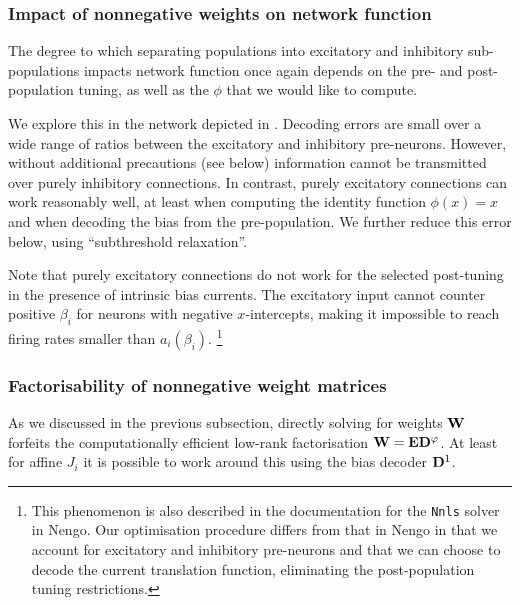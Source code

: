 \subsubsection{Impact of nonnegative weights on network function}
The degree to which separating populations into excitatory and inhibitory sub-populations impacts network function once again depends on the pre- and post-population tuning, as well as the $\phi$ that we would like to compute.

We explore this in the network depicted in .
Decoding errors are small over a wide range of ratios between the excitatory and inhibitory pre-neurons.
However, without additional precautions (see below) information cannot be transmitted over purely inhibitory connections.
In contrast, purely excitatory connections can work reasonably well, at least when computing the identity function $\phi(x) = x$ and when decoding the bias from the pre-population.
We further reduce this error below, using \enquote{subthreshold relaxation}.

Note that purely excitatory connections do not work for the selected post-tuning in the presence of intrinsic bias currents.
The excitatory input cannot counter positive $\beta_i$ for neurons with negative $x$-intercepts, making it impossible to reach firing rates smaller than $a_i(\beta_i)$.%
\footnote{This phenomenon is also described in the documentation for the \texttt{Nnls} solver in Nengo. 
Our optimisation procedure differs from that in Nengo in that we account for excitatory and inhibitory pre-neurons and that we can choose to decode the current translation function, eliminating the post-population tuning restrictions.}

\subsubsection{Factorisability of nonnegative weight matrices}
As we discussed in the previous subsection, directly solving for weights $\mathbf{W}$ forfeits the computationally efficient low-rank factorisation $\mathbf{W} = \mathbf{E} \mathbf{D}^\varphi$.
At least for affine $J_i$ it is possible to work around this using the bias decoder $\mathbf{D}^1$.

